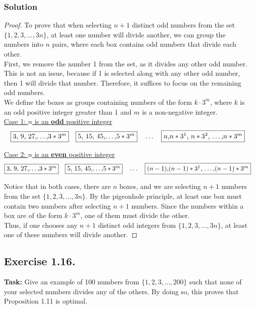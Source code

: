 \documentclass{article}
\begin{document}
\subsubsection*{Solution}

\begin{proof}
 To prove that when selecting $n+1$ distinct odd numbers from the set $\{1, 2, 3, \ldots, 3n\}$, at least one number will divide another, we can group the numbers into $n$ pairs, where each box contains odd numbers that divide each other. \\
First, we remove the number 1 from the set, as it divides any other odd number. This is not an issue, because if 1 is selected along with any other odd number, then 1 will divide that number. Therefore, it suffices to focus on the remaining odd numbers. \\
We define the boxes as groups containing numbers of the form $k \cdot 3^m$, where $k$ is an odd positive integer greater than 1 and $m$ is a non-negative integer. \\
 

\underline{Case 1: $n$ is an \textbf{odd} positive integer}
    \[
    \fbox{3, 9, 27,\dots,$3*3^m$} \quad \fbox{5, 15, 45,\dots,$5*3^m$} \quad \dots \quad \fbox{$n$,$n*3^1$, $n*3^2$, \dots ,$n*3^m$}
    \]

\underline{Case 2: $n$ is an \textbf{even} positive integer}
    \[
    \fbox{3, 9, 27,\dots,$3*3^m$} \quad \fbox{5, 15, 45,\dots,$5*3^m$} \quad \dots \quad \fbox{$(n-1)$,$(n-1)*3^1$, \dots ,$(n-1)*3^m$}
    \] 

Notice that in both cases, there are $n$ boxes, and we are selecting $n+1$ numbers from the set $\{1, 2, 3, \ldots, 3n\}$. By the pigeonhole principle, at least one box must contain two numbers after selecting $n+1$ numbers. Since the numbers within a box are of the form $k \cdot 3^m$, one of them must divide the other. \\
Thus, if one chooses any $n+1$ distinct odd integers from $\{1, 2, 3, \ldots, 3n\}$, at least one of these numbers will divide another.
    
\end{proof}

\subsection{Exercise 1.16.} 
\textbf{Task:} Give an example of 100 numbers from $\{1, 2, 3, \ldots, 200\}$ such that none of your selected numbers divides any of the others. By doing so, this proves that Proposition 1.11 is optimal.
\end{document}
